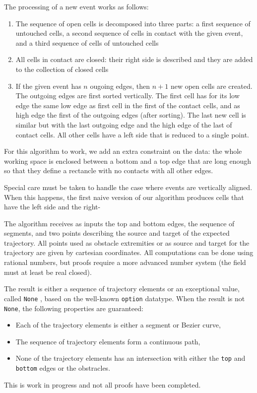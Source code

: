 \documentclass{easychair}
\begin{document}
The processing of a new event works as follows:
\begin{enumerate}
\item The sequence of open cells is decomposed into three parts:
a first sequence of untouched cells, a second sequence of cells in
contact with the given event, and a third sequence of cells of
untouched cells
\item All cells in contact are closed: their right side is
  described and they are added to the collection of closed cells
\item If the given event has \(n\) ougoing edges, then \(n+1\) new
  open cells are created.  The outgoing edges are first sorted vertically.
  The first cell has for its low edge the
  same low edge as first cell in the first of the contact cells, and
  as high edge the first of the outgoing edges (after sorting).  The
  last new cell is similar but with the last outgoing edge and the
  high edge of the last of contact cells.  All other cells have a
  left side that is reduced to a single point.
\end{enumerate}
For this algorithm to work, we add an extra constraint on the data:
the whole working space is enclosed between a bottom and a top edge
that are long enough so that they define a rectancle with no contacts
with all other edges.

Special care must be taken to handle the case where events are
vertically aligned.  When this happens, the first naive version of our
algorithm produces cells that have the left side and the right-



The algorithm receives as inputs the top and bottom edges, the sequence of segments,
and two points describing the source and target of the expected trajectory.  All
points used as obstacle extremities or as source and target for the trajectory are
given by cartesian coordinates.  All computations can be done using rational numbers,
but proofs require a more advanced number system (the field must at least
be real closed).

The result is either a sequence of trajectory elements or an exceptional value, called
{\tt None} , based
on the well-known {\tt option} datatype.  When the result is not {\tt None},
the following properties are guaranteed:
\begin{itemize}
\item Each of the trajectory elements is either a segment or Bezier curve,
\item The sequence of trajectory elements form a continuous path,
\item None of the trajectory elements has an intersection with either
the {\tt top} and {\tt bottom} edges or the obstracles.
\end{itemize}
This is work in progress and not all proofs have been completed.
\end{document}
